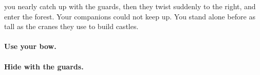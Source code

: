 you nearly catch up with the \glspl{guard}, then they twist suddenly to the right, and enter the forest.
Your companions could not keep up.
You stand alone before  as tall as the cranes they use to build castles.

\paragraph{Use your \gls{bow}.}

\paragraph{Hide with the \glspl{guard}.}

